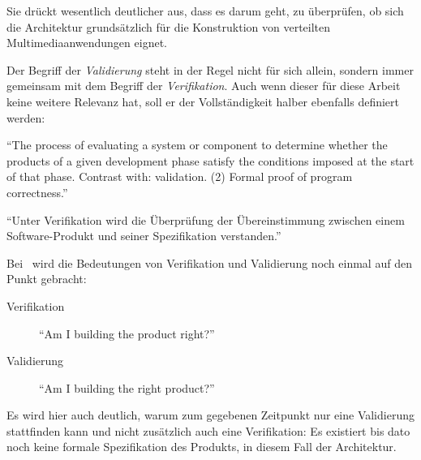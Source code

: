   Sie drückt wesentlich deutlicher aus, dass es darum geht, zu überprüfen, ob sich die Architektur grundsätzlich für die Konstruktion von verteilten Multimediaanwendungen eignet.
  
  Der Begriff der \emph{Validierung} steht in der Regel nicht für sich allein, sondern immer gemeinsam mit dem Begriff der \emph{Verifikation}. Auch wenn dieser für diese Arbeit keine weitere Relevanz hat, soll er der Vollständigkeit halber ebenfalls definiert werden:
  
  \begin{definition}\label{def:verifikation_ieee}
    "`The process of evaluating a system or component to determine whether the products of a given development phase satisfy the conditions imposed at the start of that phase. Contrast with: validation. (2) Formal proof of program correctness."'~\emph{\citep{ieee90sg}}
  \end{definition}
  
  \begin{definition}\label{def:verifikation_balzert}
    "`Unter Verifikation wird die Überprüfung der Übereinstimmung zwischen einem Software-Produkt und seiner Spezifikation verstanden."'~\emph{\citep[S. 101]{balzert1998lst}}
  \end{definition}
  
  Bei~\citep{boehm1984vv} wird die Bedeutungen von Verifikation und Validierung noch einmal auf den Punkt gebracht:
  
  \begin{description}
    \item[Verifikation] "`Am I building the product right?"'~\citep[S. 75]{boehm1984vv}
    \item[Validierung] "`Am I building the right product?"'~\citep[S. 75]{boehm1984vv}
  \end{description}
  
  Es wird hier auch deutlich, warum zum gegebenen Zeitpunkt nur eine Validierung stattfinden kann und nicht zusätzlich auch eine Verifikation: Es existiert bis dato noch keine formale Spezifikation des Produkts, in diesem Fall der Architektur.
  


